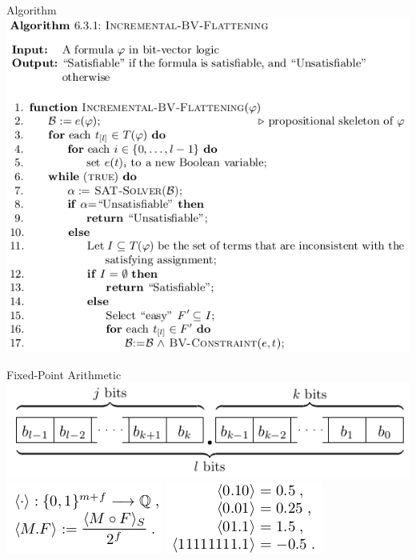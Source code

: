 \documentclass{beamer}
\begin{document}
\begin{frame}{Algorithm}
\includegraphics[scale=0.4]{algo2.png}\newline
\end{frame}

\begin{frame}{Fixed-Point Arithmetic}
\includegraphics[scale=0.5]{fixpoint1.png}\newline
\includegraphics[scale=0.5]{fixpoint2.png}\newline
\includegraphics[scale=0.5]{fixpoint3.png}\newline
\end{frame}
\end{document}
